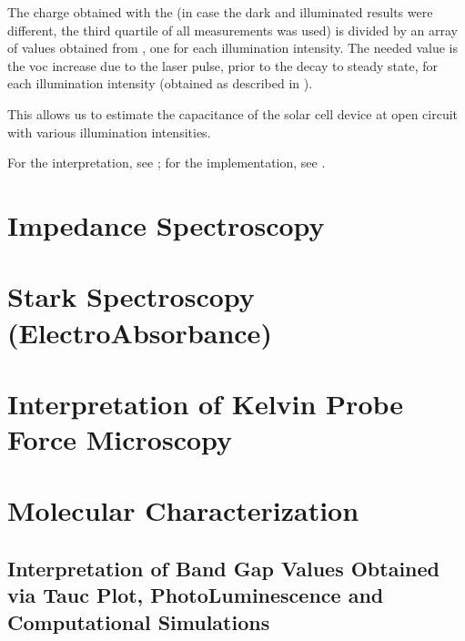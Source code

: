 	The charge obtained with the  (in case the dark and illuminated results were different, the third quartile of all  measurements was used) is divided by an array of values obtained from , one for each illumination intensity. The needed value is the \gls{voc} increase due to the laser pulse, prior to the decay to steady state, for each illumination intensity (obtained as described in ).

	This allows us to estimate the capacitance of the solar cell device at open circuit with various illumination intensities.

	For the interpretation, see ; for the implementation, see .

\section{Impedance Spectroscopy}

\section{Stark Spectroscopy (ElectroAbsorbance)}

\section{Interpretation of Kelvin Probe Force Microscopy}\label{interpretation_kpfm}

\section{Molecular Characterization}
\subsection{Interpretation of Band Gap Values Obtained via Tauc Plot, PhotoLuminescence and Computational Simulations}\label{interpretation_bg}

%
%

